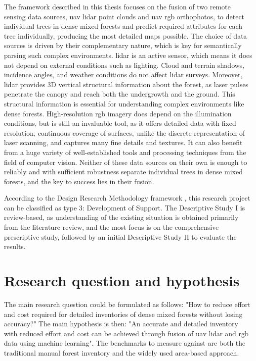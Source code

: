 The framework described in this thesis focuses on the fusion of two remote sensing data sources, \gls{uav} \gls{lidar} point clouds and \gls{uav} \gls{rgb} orthophotos, to detect individual trees in dense mixed forests and predict required attributes for each tree individually, producing the most detailed maps possible.
The choice of data sources is driven by their complementary nature, which is key for semantically parsing such complex environments.
\gls{lidar} is an active sensor, which means it does not depend on external conditions such as lighting.
Cloud and terrain shadows, incidence angles, and weather conditions do not affect \gls{lidar} surveys.
Moreover, \gls{lidar} provides 3D vertical structural information about the forest, as laser pulses penetrate the canopy and reach both the undergrowth and the ground.
This structural information is essential for understanding complex environments like dense forests.
High-resolution \gls{rgb} imagery does depend on the illumination conditions, but is still an invaluable tool, as it offers detailed data with fixed resolution, continuous coverage of surfaces, unlike the discrete representation of laser scanning, and captures many fine details and textures.
It can also benefit from a huge variety of well-established tools and processing techniques from the field of computer vision.
Neither of these data sources on their own is enough to reliably and with sufficient robustness separate individual trees in dense mixed forests, and the key to success lies in their fusion.

According to the Design Research Methodology framework \citep{blessingDRMDesignResearch2009}, this research project can be classified as type 3: Development of Support.
The Descriptive Study I is review-based, as understanding of the existing situation is obtained primarily from the literature review, and the most focus is on the comprehensive prescriptive study, followed by an initial Descriptive Study II to evaluate the results.

\section{Research question and hypothesis}\label{sec-research-question}

The main research question could be formulated as follows: "How to reduce effort and cost required for detailed inventories of dense mixed forests without losing accuracy?"
The main hypothesis is then: "An accurate and detailed inventory with reduced effort and cost can be achieved through fusion of \gls{uav} \gls{lidar} and \gls{rgb} data using machine learning".
The benchmarks to measure against are both the traditional manual forest inventory and the widely used area-based approach.

